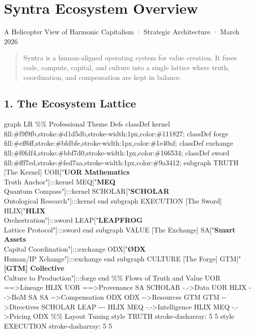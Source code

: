 \documentclass[12pt,a4paper]{article}
\begin{document}
\section{Syntra Ecosystem Overview}\label{syntra-ecosystem-overview}

A Helicopter View of Harmonic Capitalism · Strategic Architecture ·
March 2026

\begin{quote}
Syntra is a human-aligned operating system for value creation. It fuses
code, compute, capital, and culture into a single lattice where truth,
coordination, and compensation are kept in balance.
\end{quote}

\subsection{1. The Ecosystem Lattice}\label{the-ecosystem-lattice}

graph LR \%\% Professional Theme Defs classDef kernel
fill:\#f9f9fb,stroke:\#d1d5db,stroke-width:1px,color:\#111827; classDef
forge fill:\#eff6ff,stroke:\#bfdbfe,stroke-width:1px,color:\#1e40af;
classDef exchange
fill:\#f0fdf4,stroke:\#bbf7d0,stroke-width:1px,color:\#166534; classDef
sword fill:\#fff7ed,stroke:\#fed7aa,stroke-width:1px,color:\#9a3412;
subgraph TRUTH {[}The Kernel{]} UOR{[}"\textbf{UOR Mathematics}\\
Truth Anchor"{]}:::kernel MEQ{[}"\textbf{MEQ}\\
Quantum Compass"{]}:::kernel SCHOLAR{[}"\textbf{SCHOLAR}\\
Ontological Research"{]}:::kernel end subgraph EXECUTION {[}The Sword{]}
HLIX{[}"\textbf{HLIX}\\
Orchestration"{]}:::sword LEAP{[}"\textbf{LEAPFROG}\\
Lattice Protocol"{]}:::sword end subgraph VALUE {[}The Exchange{]}
SA{[}"\textbf{Smart Assets}\\
Capital Coordination"{]}:::exchange ODX{[}"\textbf{ØDX}\\
Human/IP Xchange"{]}:::exchange end subgraph CULTURE {[}The Forge{]}
GTM{[}"\textbf{{[}GTM{]} Collective}\\
Culture to Production"{]}:::forge end \%\% Flows of Truth and Value UOR
==\textgreater\textbar Lineage\textbar{} HLIX UOR
==\textgreater\textbar Provenance\textbar{} SA SCHOLAR
-.-\textgreater\textbar Data\textbar{} UOR HLIX
-\/-\textgreater\textbar BoM\textbar{} SA SA
-\/-\textgreater\textbar Compensation\textbar{} ODX ODX
-\/-\textgreater\textbar Resources\textbar{} GTM GTM
-\/-\textgreater\textbar Directives\textbar{} SCHOLAR LEAP -\/-\/- HLIX
MEQ -.-\textgreater\textbar Intelligence\textbar{} HLIX MEQ
-.-\textgreater\textbar Pricing\textbar{} ODX \%\% Layout Tuning style
TRUTH stroke-dasharray: 5 5 style EXECUTION stroke-dasharray: 5 5
\end{document}
